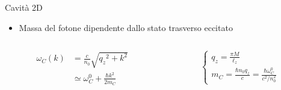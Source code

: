 \documentclass[10pt]{beamer}
\begin{document}
\begin{frame}{Cavità 2D}%

    \begin{figure}
    \end{figure}
    
    \begin{itemize}
     \item Massa del fotone dipendente dallo stato trasverso eccitato
    \end{itemize}
\vspace{-.5cm}        
      \begin{minipage}{\textwidth}
      \begin{columns}
	  \begin{column}{.5\textwidth}

	   \begin{align*}
	\omega_C(k) &= \frac{c}{n_0}\sqrt{{q_z}^2 + k^2} \\ 
		&\simeq \omega_C^0 + \frac{\hbar k^2}{2m_C}
	\end{align*}
	  \end{column}
	    
	  \begin{column}{.5\textwidth}
	  \footnotesize
	    $$\begin{cases}
	      q_z = \frac{\pi M}{\ell_z} \\
	      m_C = \frac{\hbar n_0 q_z}{c} = \frac{\hbar \omega_C^0}{c^2/n_0^2}
	    \end{cases}
	    $$
	   \end{column}
      \end{columns}

      \end{minipage}

  

    
\end{frame}
\end{document}
